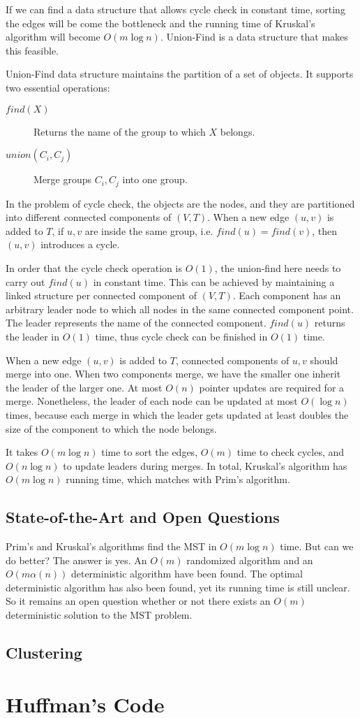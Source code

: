 If we can find a data structure that allows cycle check in constant time, sorting the edges will be come the bottleneck and the running time of Kruskal's algorithm will become $O(m\log n)$. Union-Find is a data structure that makes this feasible.

Union-Find data structure maintains the partition of a set of objects. It supports two essential operations:
\begin{description}
\item[$find(X)$]Returns the name of the group to which $X$ belongs.
\item[$union(C_i, C_j)$]Merge groups $C_i,C_j$ into one group.
\end{description} 
In the problem of cycle check, the objects are the nodes, and they are partitioned into different connected components of $(V,T)$. When a new edge $(u,v)$ is added to $T$, if $u,v$ are inside the same group, i.e. $find(u)=find(v)$, then $(u,v)$ introduces a cycle. 

In order that the cycle check operation is $O(1)$, the union-find here needs to carry out $find(u)$ in constant time. This can be achieved by maintaining a linked structure per connected component of $(V,T)$. Each component has an arbitrary leader node to which all nodes in the same connected component point. The leader represents the name of the connected component. $find(u)$ returns the leader in $O(1)$ time, thus cycle check can be finished in $O(1)$ time. 

When a new edge $(u,v)$ is added to $T$, connected components of $u,v$ should merge into one. When two components merge, we have the smaller one inherit the leader of the larger one. At most $O(n)$ pointer updates are required for a merge. Nonetheless, the leader of each node can be updated at most $O(\log n)$ times, because each merge in which the leader gets updated at least doubles the size of the component to which the node belongs. 

It takes $O(m\log n)$ time to sort the edges, $O(m)$ time to check cycles, and $O(n\log n)$ to update leaders during merges. In total, Kruskal's algorithm has $O(m\log n)$ running time, which matches with Prim's algorithm.
\subsection{State-of-the-Art and Open Questions}
Prim's and Kruskal's algorithms find the MST in $O(m\log n)$ time. But can we do better? The answer is yes. An $O(m)$ randomized algorithm and an $O(m\alpha(n))$ deterministic algorithm have been found. The optimal deterministic algorithm has also been found, yet its running time is still unclear. So it remains an open question whether or not there exists an $O(m)$ deterministic solution to the MST problem.
\subsection{Clustering}
\section{Huffman's Code}
\ifx\PREAMBLE\undefined

\fi